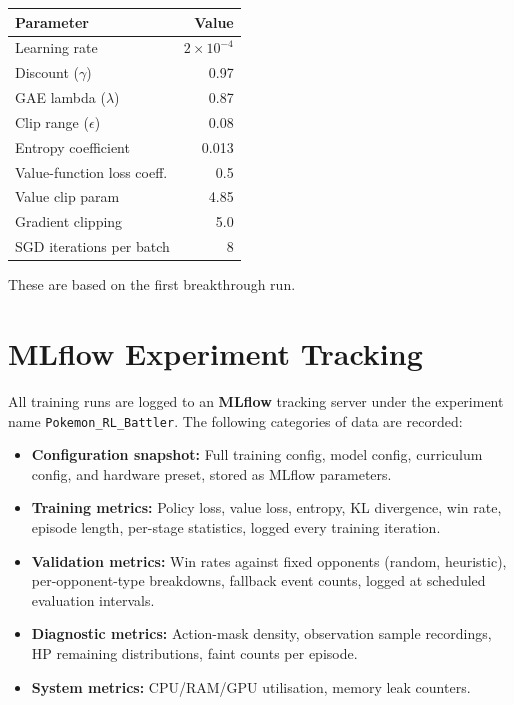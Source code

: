 \begin{center}
\small
\begin{tabularx}{0.7\textwidth}{l r}
  \toprule
  \textbf{Parameter} & \textbf{Value} \\
  \midrule
  Learning rate              & $2 \times 10^{-4}$ \\
  Discount ($\gamma$)        & 0.97 \\
  GAE lambda ($\lambda$)     & 0.87 \\
  Clip range ($\epsilon$)    & 0.08 \\
  Entropy coefficient        & 0.013 \\
  Value-function loss coeff. & 0.5 \\
  Value clip param           & 4.85 \\
  Gradient clipping          & 5.0 \\
  SGD iterations per batch   & 8 \\
  \bottomrule
\end{tabularx}
\end{center}

These are based on the first breakthrough run.

\section{MLflow Experiment Tracking}

All training runs are logged to an \textbf{MLflow} tracking server under the
experiment name \texttt{Pokemon\_RL\_Battler}.  The following categories of
data are recorded:

\begin{itemize}
  \item \textbf{Configuration snapshot:} Full training config, model config,
        curriculum config, and hardware preset, stored as MLflow parameters.
  \item \textbf{Training metrics:} Policy loss, value loss, entropy,
        KL divergence, win rate, episode length, per-stage statistics, logged
        every training iteration.
  \item \textbf{Validation metrics:} Win rates against fixed opponents
        (random, heuristic), per-opponent-type breakdowns, fallback event
        counts, logged at scheduled evaluation intervals.
  \item \textbf{Diagnostic metrics:} Action-mask density, observation sample
        recordings, HP remaining distributions, faint counts per episode.
  \item \textbf{System metrics:} CPU/RAM/GPU utilisation, memory leak counters.
\end{itemize}

